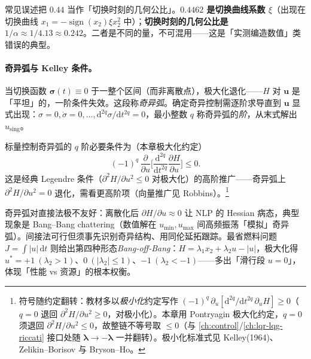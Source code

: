\begin{note}
常见误述把 $0.44$ 当作「切换时刻的几何公比」。\textbf{$0.4462$ 是切换曲线系数 $\xi$}（出现在切换曲线 $x_1=-\operatorname{sign}(x_2)\xi x_2^2$ 中）；\textbf{切换时刻的几何公比是 $1/\alpha\approx 1/4.13\approx 0.242$}。二者是不同的量，不可混用——这是「实测编造数值」类错误的典型。
\end{note}

\paragraph{奇异弧与 Kelley 条件。}
当切换函数 $\boldsymbol\sigma(t)\equiv0$ 于一整个区间（而非离散点），极大化退化——$H$ 对 $\mathbf u$ 是「平坦」的，一阶条件失效。这段称\emph{奇异弧}。确定奇异控制需逐阶求导直到 $\mathbf u$ 显式出现：$\sigma=0,\dot\sigma=0,\dots,\mathrm d^{2q}\sigma/\mathrm dt^{2q}=0$，最小整数 $q$ 称奇异弧的\emph{阶}，从末式解出 $u_{\mathrm{sing}}$。

\begin{theorem}\label{thm:pmp-kelley}
标量控制奇异弧的 $q$ 阶必要条件为（本章极大化约定）
\begin{equation}
  (-1)^q\,\frac{\partial}{\partial u}\Big[\frac{\mathrm d^{2q}}{\mathrm dt^{2q}}\frac{\partial H}{\partial u}\Big]\le0.
  \label{eq:pmp-kelley}
\end{equation}
这是经典 Legendre 条件（$\partial^2 H/\partial u^2\le0$ 对极大化）的高阶推广——奇异弧上 $\partial^2 H/\partial u^2=0$ 退化，需看更高阶项\cite{kelley1964second}（向量推广见 Robbins\cite{robbins1967generalized}）。\footnote{符号随约定翻转：教材多以\emph{极小化}约定写作 $(-1)^q\,\partial_u[\mathrm d^{2q}\!/\mathrm dt^{2q}\,\partial_uH]\ge0$（$q=0$ 退回 $\partial^2H/\partial u^2\ge0$，对极小化）。本章用 Pontryagin 极大化约定，$q=0$ 须退回 $\partial^2H/\partial u^2\le0$，故整链不等号取 $\le0$（与 \cref{ch:control}/\cref{ch:lqr-lqg-riccati} 接口处随 $\boldsymbol\lambda\to-\boldsymbol\lambda$ 一并翻转）。极小化标准式见 Kelley(1964)\cite{kelley1964second}、Zelikin--Borisov 与 Bryson--Ho\cite{bryson1975applied}。}
\end{theorem}

奇异弧对直接法极不友好：离散化后 $\partial H/\partial u\approx0$ 让 NLP 的 Hessian 病态，典型现象是 Bang--Bang chattering（数值解在 $u_{\min},u_{\max}$ 间高频振荡「模拟」奇异弧）。间接法可行但须事先识别奇异结构、用同伦延拓跟踪。最省燃料问题 $J=\int|u|\,\mathrm dt$ 则给出第四种形态\emph{Bang-off-Bang}：$H=\lambda_1 x_2+\lambda_2 u-|u|$，极大化得 $u^\ast=+1\ (\lambda_2>1)$、$0\ (|\lambda_2|\le1)$、$-1\ (\lambda_2<-1)$——多出「滑行段 $u=0$」，体现「性能 vs 资源」的根本权衡。

